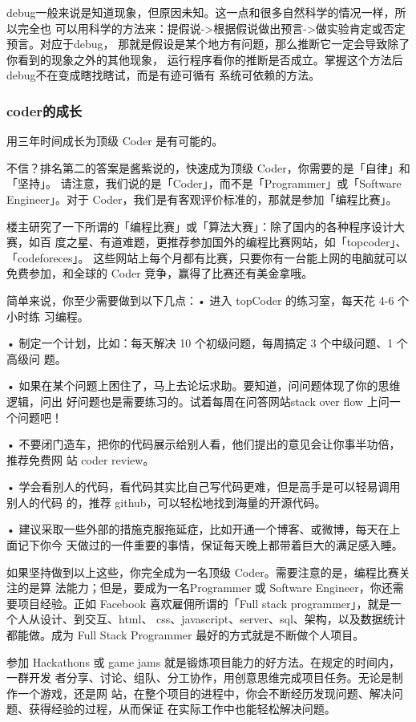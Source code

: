 \documentclass[11pt]{article}
\begin{document}
debug一般来说是知道现象，但原因未知。这一点和很多自然科学的情况一样，所以完全也
可以用科学的方法来：提假说->根据假说做出预言->做实验肯定或否定预言。对应于debug，
那就是假设是某个地方有问题，那么推断它一定会导致除了你看到的现象之外的其他现象，
运行程序看你的推断是否成立。掌握这个方法后debug不在变成瞎找瞎试，而是有迹可循有
系统可依赖的方法。
\subsubsection*{coder的成长}
\label{sec:orgheadline142}
用三年时间成长为顶级 Coder 是有可能的。

不信？排名第二的答案是酱紫说的，快速成为顶级 Coder，你需要的是「自律」和「坚持」。
请注意，我们说的是「Coder」，而不是「Programmer」或「Software Engineer」。对于
Coder，我们是有客观评价标准的，那就是参加「编程比赛」。

楼主研究了一下所谓的「编程比赛」或「算法大赛」：除了国内的各种程序设计大赛，如百
度之星、有道难题，更推荐参加国外的编程比赛网站，如「topcoder」、「codeforeces」。
这些网站上每个月都有比赛，只要你有一台能上网的电脑就可以免费参加，和全球的 Coder
竞争，赢得了比赛还有美金拿哦。

简单来说，你至少需要做到以下几点：• 进入 topCoder 的练习室，每天花 4-6 个小时练
习编程。

• 制定一个计划，比如：每天解决 10 个初级问题，每周搞定 3 个中级问题、1 个高级问
题。

• 如果在某个问题上困住了，马上去论坛求助。要知道，问问题体现了你的思维逻辑，问出
好问题也是需要练习的。试着每周在问答网站stack over flow 上问一个问题吧！

• 不要闭门造车，把你的代码展示给别人看，他们提出的意见会让你事半功倍，推荐免费网
站 coder review。

• 学会看别人的代码，看代码其实比自己写代码更难，但是高手是可以轻易调用别人的代码
的，推荐 github，可以轻松地找到海量的开源代码。

• 建议采取一些外部的措施克服拖延症，比如开通一个博客、或微博，每天在上面记下你今
天做过的一件重要的事情，保证每天晚上都带着巨大的满足感入睡。

如果坚持做到以上这些，你完全成为一名顶级 Coder。需要注意的是，编程比赛关注的是算
法能力；但是，要成为一名Programmer 或 Software Engineer，你还需要项目经验。正如
Facebook 喜欢雇佣所谓的「Full stack programmer」，就是一个人从设计、到交互、html、
css、javascript、server、sql、架构，以及数据统计都能做。成为 Full Stack
Programmer 最好的方式就是不断做个人项目。

参加 Hackathons 或 game jams 就是锻炼项目能力的好方法。在规定的时间内，一群开发
者分享、讨论、组队、分工协作，用创意思维完成项目任务。无论是制作一个游戏，还是网
站，在整个项目的进程中，你会不断经历发现问题、解决问题、获得经验的过程，从而保证
在实际工作中也能轻松解决问题。
\end{document}
